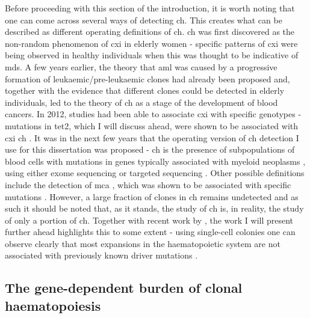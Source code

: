 Before proceeding with this section of the introduction, it is worth noting that one can come across several ways of detecting \ac{ch}. This creates what can be described as different operating definitions of \ac{ch}. \ac{ch} was first discovered as the non-random phenomenon of \ac{cxi} in elderly women \cite{Busque1996-ek,Champion1997-fj} - specific patterns of \ac{cxi} were being observed in healthy individuals when this was thought to be indicative of \ac{mds}. A few years earlier, the theory that \ac{aml} was caused by a progressive formation of leukaemic/pre-leukaemic clones had already been proposed \cite{Fialkow1991-de} and, together with the evidence that different clones could be detected in elderly individuals, led to the theory of \ac{ch} as a stage of the development of blood cancers. In 2012, studies had been able to associate \ac{cxi} with specific genotypes - mutations in \ac{tet2}, which I will discuss ahead, were shown to be associated with \ac{cxi} \ac{ch} \cite{Busque2012-oc}. It was in the next few years that the operating version of \ac{ch} detection I use for this dissertation was proposed - \ac{ch} is the presence of subpopulations of blood cells with mutations in genes typically associated with myeloid neoplasms \cite{Jaiswal2014-rl,Genovese2014-eu,Xie2014-np,McKerrell2015-rl}, using either exome sequencing \cite{Xie2014-np,Jaiswal2014-rl,Genovese2014-eu} or targeted sequencing \cite{McKerrell2015-rl}. Other possible definitions include the detection of \ac{mca} \cite{Jacobs2012-cj,Laurie2012-fc,Loh2018-xp,Gao2021-ph}, which was shown to be associated with specific mutations \cite{Loh2018-xp,Gao2021-ph}. However, a large fraction of clones in \ac{ch} remains undetected \cite{Poon2020-hl,Genovese2014-eu,Zink2017-zi} and as such it should be noted that, as it stands, the study of \ac{ch} is, in reality, the study of only a portion of \ac{ch}. Together with recent work by , the work I will present further ahead highlights this to some extent - using single-cell colonies one can observe clearly that most expansions in the haematopoietic system are not associated with previously known driver mutations \cite{Fabre2021-uw,Mitchell2021-zl}. 

\subsection{The gene-dependent burden of clonal haematopoiesis}

